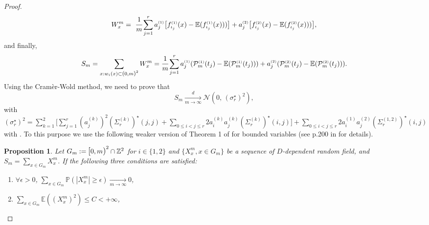 \documentclass[12pt]{article}
\theoremstyle{Theorem}
\newtheorem{Proposition}[Theorem]{Proposition}
\begin{document}
\begin{proof}
\begin{equation}
\label{X}
W_{x}^{m} =~\cfrac{1}{m}\sum_{j = 1}^{r}a^{\scriptscriptstyle (1)}_j\big[f_{\scriptscriptstyle t_j}^{\scriptscriptstyle (1)}(x) - \mathbb{E}(f_{\scriptscriptstyle t_j}^{\scriptscriptstyle (1)}(x))) \big] + a^{\scriptscriptstyle (2)}_j\big[f_{\scriptscriptstyle t_j}^{\scriptscriptstyle (2)}(x) - \mathbb{E}(f_{\scriptscriptstyle t_j}^{\scriptscriptstyle (2)}(x))) \big] ,
\end{equation}
and finally,
\begin{equation*}
S_m = \sum_{x: w_{i}(x) \subset \text{\larger[1]{$($}}0, m \text{\larger[1]{$)$}}^{2}} W_{x}^{m} = \cfrac{1}{m}\sum_{j = 1}^{r}a^{\scriptscriptstyle (1)}_j(\mathcal{P}^{\scriptscriptstyle (1)}_{m}(t_j) - \mathbb{E}(\mathcal{P}^{\scriptscriptstyle (1)}_{m}(t_j))) + a^{\scriptscriptstyle (2)}_j(\mathcal{P}^{\scriptscriptstyle (2)}_{m}(t_j) - \mathbb{E}(\mathcal{P}^{\scriptscriptstyle (2)}_{m}(t_j))) .
\end{equation*}
Using the Cram\`{e}r-Wold method, we need to prove that
\vspace{-0.2cm}
\begin{equation*}
S_{m} \xrightarrow[m \to \infty]{d} \mathcal{N}\left(0, \, (\sigma^{\star}_{r})^{2} \right),
\end{equation*}
with $(\sigma^{\scriptscriptstyle \star}_{r})^{ \scriptscriptstyle 2} = \sum^{2}_{k = 1}\big[\sum_{j = 1}^{r}(a^{\scriptscriptstyle (k)}_{j})^{2}(\Sigma_{r}^{\scriptscriptstyle (k)})^{\star}(j,j) +  \sum_{0 \leq i < j \leq r} 2a^{\scriptscriptstyle (k)}_{i}a^{\scriptscriptstyle (k)}_{j}(\Sigma_{r}^{\scriptscriptstyle (k)})^{\star}(i,j)\big] + \sum_{0 \leq i < j \leq r}   2a^{\scriptscriptstyle (1)}_{i}a^{\scriptscriptstyle (2)}_{j}(\Sigma_{r}^{\scriptscriptstyle (1, 2)})^{\star}(i,j)$ with . To this purpose we use the following weaker version of Theorem 1 of \cite{Lothar} for bounded variables (see p.200 in \cite{Lothar} for details).
\begin{Proposition}
\label{tclbis}
Let $G_{m} := \text{\larger[1]{$[$}}0, m \text{\larger[1]{$)$}}^{2} \cap \mathbb{Z}^{2}$ for $i \in \{1,2\}$ and $\{X^{m}_{x}, x \in G_{m}\}$ be a sequence of $D$\hspace{-0.05cm}-dependent random field, and $S_m = \sum_{x \in G_{m}} X^{m}_{x}$. If the following three conditions are satisfied:
\begin{enumerate}
\item[(i)]  $\forall \epsilon > 0$, $\sum_{x \in G_m} \mathbb{P}(|X^{m}_{x}| \geq \epsilon) \xrightarrow[m \to  \infty]{} 0 $,
\item[(ii)] $\sum_{x \in G_m} \mathbb{E}((X^{m}_{x})^{2}) \leq C < + \infty$,

\end{enumerate}
\end{Proposition}
\end{proof}
\end{document}
